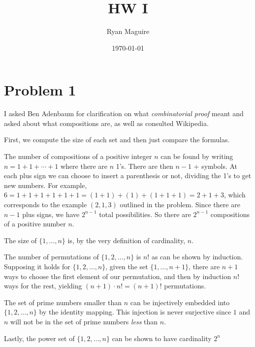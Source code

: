 \documentclass{article}
\title{HW I}
\author{Ryan Maguire}
\date{\today}
\begin{document}
    \maketitle
    \section*{Problem 1}
        I asked Ben Adenbaum for clarification on what \textit{combinatorial proof} meant
        and asked about what compositions are, as well as consulted Wikipedia.
        \par\hfill\par\noindent
        First, we compute the size of each set and then just compare the formulas.
        \par\hfill\par\noindent
        The number of compositions of a positive integer $n$ can be found by writing
        $n=1+1+\cdots+1$ where there are $n$ 1's. There are then $n-1$ + symbols. At each
        plus sign we can choose to insert a parenthesis or not, dividing the 1's to get
        new numbers. For example, $6=1+1+1+1+1+1=(1+1)+(1)+(1+1+1)=2+1+3$, which
        corresponds to the example $(2,1,3)$ outlined in the problem. Since there are
        $n-1$ plus signs, we have $2^{n-1}$ total possibilities. So there are
        $2^{n-1}$ compositions of a positive number $n$.
        \par\hfill\par\noindent
        The size of $\{1,\dots,n\}$ is, by the very definition of cardinality, $n$.
        \par\hfill\par\noindent
        The number of permutations of $\{1,2,\dots,n\}$ is $n!$ as can be shown by
        induction. Supposing it holds for $\{1,2,\dots,n\}$, given the set $\{1,\dots,n+1\}$,
        there are $n+1$ ways to choose the first element of our permutation, and then by
        induction $n!$ ways for the rest, yielding $(n+1)\cdot{n}!=(n+1)!$ permutations.
        \par\hfill\par\noindent
        The set of prime numbers smaller than $n$ can be injectively embedded into
        $\{1,2,\dots,n\}$ by the identity mapping. This injection is never surjective
        since $1$ and $n$ will not be in the set of prime numbers \textit{less} than $n$.
        \par\hfill\par\noindent
        Lastly, the power set of $\{1,2,\dots,n\}$ can be shown to have cardinality $2^{n}$
\end{document}
